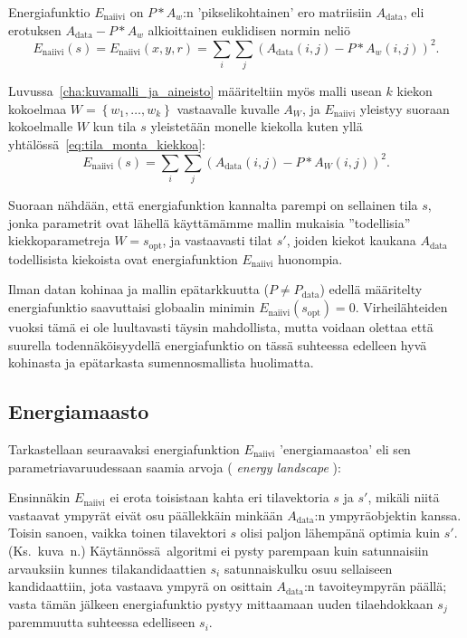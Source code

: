 Energiafunktio $E_\text{naiivi}$ on $P \ast A_w$:n 'pikselikohtainen' ero matriisiin $A_{\text{data}}$,
eli erotuksen $A_{\text{data}} - P \ast A_w$ alkioittainen euklidisen normin neliö
\begin{equation}
    E_\text{naiivi}(s) = E_\text{naiivi}(x, y, r) = \sum_i \sum_j \left(A_{\text{data}}(i, j) - P \ast A_w(i, j)\right)^2.
\end{equation}

Luvussa~\ref{cha:kuvamalli_ja_aineisto} määriteltiin myös malli usean $k$ kiekon kokoelmaa $W = \left\{w_1, \dots, w_k\right\}$ vastaavalle kuvalle $A_W$, ja
$E_\text{naiivi}$ yleistyy suoraan kokoelmalle $W$ kun tila $s$ yleistetään monelle kiekolla kuten yllä yhtälössä~\eqref{eq:tila_monta_kiekkoa}:
\begin{equation}
    E_\text{naiivi}(s) = \sum_i \sum_j \left(A_{\text{data}}(i, j) - P \ast A_W(i, j)\right)^2.
\end{equation}

Suoraan nähdään, että energiafunktion kannalta parempi on sellainen tila $s$, jonka parametrit ovat lähellä käyttämämme mallin mukaisia ''todellisia'' kiekkoparametreja $W = s_\text{opt}$,
ja vastaavasti tilat $s'$, joiden kiekot kaukana $A_\text{data}$ todellisista kiekoista ovat energiafunktion $E_\text{naiivi}$ huonompia.

Ilman datan kohinaa ja mallin epätarkkuutta ($P \not = P_\text{data}$) edellä määritelty energiafunktio saavuttaisi globaalin minimin $E_\text{naiivi}(s_\text{opt}) = 0$.
Virheilähteiden vuoksi tämä ei ole luultavasti täysin mahdollista, mutta voidaan olettaa että suurella todennäköisyydellä energiafunktio on tässä suhteessa edelleen hyvä kohinasta ja epätarkasta sumennosmallista huolimatta.

\subsection{Energiamaasto}
\label{sub:energiamaasto}

Tarkastellaan seuraavaksi energiafunktion $E_\text{naiivi}$ 'energiamaastoa' eli sen parametriavaruudessaan saamia arvoja ( \emph{energy landscape} \cite{salamonetal}):

Ensinnäkin $E_\text{naiivi}$ ei erota toisistaan kahta eri tilavektoria $s$ ja $s'$, mikäli niitä vastaavat ympyrät eivät osu päällekkäin minkään $A_{\text{data}}$:n ympyräobjektin kanssa.
Toisin sanoen, vaikka toinen tilavektori $s$ olisi paljon lähempänä optimia kuin $s'$.
(Ks.~kuva~n.)
Käytännössä algoritmi ei pysty parempaan kuin satunnaisiin arvauksiin kunnes tilakandidaattien $s_i$ satunnaiskulku osuu sellaiseen kandidaattiin, jota vastaava ympyrä on osittain $A_{\text{data}}$:n tavoiteympyrän päällä;
vasta tämän jälkeen energiafunktio pystyy mittaamaan uuden tilaehdokkaan $s_j$ paremmuutta suhteessa edelliseen $s_i$.


